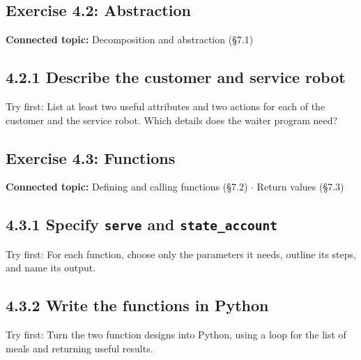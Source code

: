 \documentclass[11pt]{article}
\begin{document}
\begin{keepsection}
\section{Exercise 4.2: Abstraction}

\textbf{Connected topic:} Decomposition and abstraction (§7.1)

\begin{keepsection}
\subsection{4.2.1 Describe the customer and service robot}

Try first: List at least two useful attributes and two actions for each of the customer and the service robot. Which details does the waiter program need?

\end{keepsection}
\end{keepsection}

\begin{keepsection}
\section{Exercise 4.3: Functions}

\textbf{Connected topic:} Defining and calling functions (§7.2) \ensuremath{\cdot} Return values (§7.3)

\begin{keepsection}
\subsection{4.3.1 Specify \texttt{serve} and \texttt{state\_account}}

Try first: For each function, choose only the parameters it needs, outline its steps, and name its output.

\end{keepsection}

\begin{keepsection}
\subsection{4.3.2 Write the functions in Python}

Try first: Turn the two function designs into Python, using a loop for the list of meals and returning useful results.

\end{keepsection}
\end{keepsection}
\end{document}
